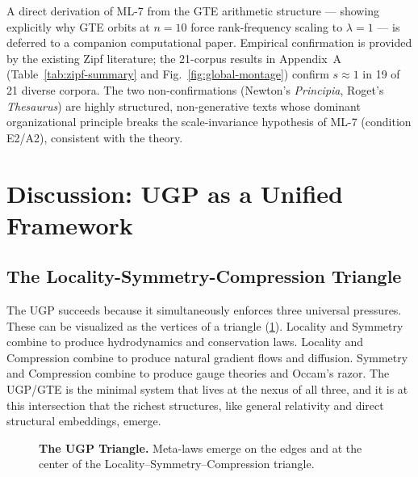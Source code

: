 \documentclass[11pt]{article}
\begin{document}
A direct derivation of ML-7 from the GTE arithmetic structure --- showing
explicitly why GTE orbits at $n=10$ force rank-frequency scaling to $\lambda=1$
--- is deferred to a companion computational paper. Empirical confirmation is
provided by the existing Zipf literature; the 21-corpus results in
Appendix~A (Table~\ref{tab:zipf-summary} and Fig.~\ref{fig:global-montage})
confirm $s \approx 1$ in 19 of 21 diverse corpora. The two non-confirmations
(Newton's \emph{Principia}, Roget's \emph{Thesaurus}) are highly structured,
non-generative texts whose dominant organizational principle breaks the
scale-invariance hypothesis of ML-7 (condition E2/A2), consistent with the theory.

\section{Discussion: UGP as a Unified Framework}

\subsection{The Locality-Symmetry-Compression Triangle}
The UGP succeeds because it simultaneously enforces three universal pressures. These can be visualized as the vertices of a triangle (\cref{fig:triangle}). Locality and Symmetry combine to produce hydrodynamics and conservation laws. Locality and Compression combine to produce natural gradient flows and diffusion. Symmetry and Compression combine to produce gauge theories and Occam's razor. The UGP/GTE is the minimal system that lives at the nexus of all three, and it is at this intersection that the richest structures, like general relativity and direct structural embeddings, emerge.

\begin{figure}[h!]
    \centering
    \caption{\textbf{The UGP Triangle.} Meta-laws emerge on the edges and at the center of the Locality–Symmetry–Compression triangle.}
    \label{fig:triangle}
\end{figure}
\end{document}
